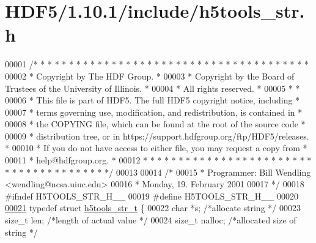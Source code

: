 \hypertarget{_h_d_f5_21_810_81_2include_2h5tools__str_8h_source}{}\section{H\+D\+F5/1.10.1/include/h5tools\+\_\+str.h}
\label{_h_d_f5_21_810_81_2include_2h5tools__str_8h_source}

\begin{DoxyCode}
00001 \textcolor{comment}{/* * * * * * * * * * * * * * * * * * * * * * * * * * * * * * * * * * * * * * *}
00002 \textcolor{comment}{ * Copyright by The HDF Group.                                               *}
00003 \textcolor{comment}{ * Copyright by the Board of Trustees of the University of Illinois.         *}
00004 \textcolor{comment}{ * All rights reserved.                                                      *}
00005 \textcolor{comment}{ *                                                                           *}
00006 \textcolor{comment}{ * This file is part of HDF5.  The full HDF5 copyright notice, including     *}
00007 \textcolor{comment}{ * terms governing use, modification, and redistribution, is contained in    *}
00008 \textcolor{comment}{ * the COPYING file, which can be found at the root of the source code       *}
00009 \textcolor{comment}{ * distribution tree, or in https://support.hdfgroup.org/ftp/HDF5/releases.  *}
00010 \textcolor{comment}{ * If you do not have access to either file, you may request a copy from     *}
00011 \textcolor{comment}{ * help@hdfgroup.org.                                                        *}
00012 \textcolor{comment}{ * * * * * * * * * * * * * * * * * * * * * * * * * * * * * * * * * * * * * * */}
00013 
00014 \textcolor{comment}{/*}
00015 \textcolor{comment}{ * Programmer:  Bill Wendling <wendling@ncsa.uiuc.edu>}
00016 \textcolor{comment}{ *              Monday, 19. February 2001}
00017 \textcolor{comment}{ */}
00018 \textcolor{preprocessor}{#ifndef H5TOOLS\_STR\_H\_\_}
00019 \textcolor{preprocessor}{#define H5TOOLS\_STR\_H\_\_}
00020 
\hyperlink{structh5tools__str__t}{00021} \textcolor{keyword}{typedef} \textcolor{keyword}{struct }\hyperlink{structh5tools__str__t}{h5tools\_str\_t} \{
00022     \textcolor{keywordtype}{char}    *s;     \textcolor{comment}{/*allocate string       */}
00023     \textcolor{keywordtype}{size\_t}  len;        \textcolor{comment}{/*length of actual value    */}
00024     \textcolor{keywordtype}{size\_t}  nalloc;     \textcolor{comment}{/*allocated size of string  */}

\end{DoxyCode}
